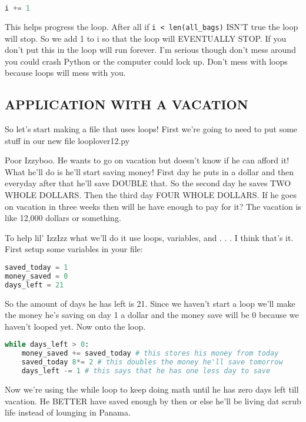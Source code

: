 \documentclass{article}
\begin{document}
\begin{lstlisting}[language=Python]
i += 1
\end{lstlisting}

This helps progress the loop. 
After all if \verb|i < len(all_bags)| ISN'T true the loop will stop. 
So we add 1 to i so that the loop will EVENTUALLY STOP. 
If you don't put this in the loop will run forever. 
I'm serious though don't mess around you could crash Python or the computer could 
lock up. 
Don't mess with loops because loops will mess with you.

\newpage
\subsection{APPLICATION WITH A VACATION}

So let's start making a file that uses loops! 
First we're going to need to put some stuff in our new file looplover12.py

\begin{displayquote}
	Poor Izzyboo. 
    He wants to go on vacation but doesn't know if he can afford it!
    What he'll do is he'll start saving money!
    First day he puts in a dollar and then everyday after that he'll save DOUBLE that. 
    So the second day he saves TWO WHOLE DOLLARS. 
    Then the third day FOUR WHOLE DOLLARS.
    If he goes on vacation in three weeks then will he have enough to pay for it? 
    The vacation is like 12,000 dollars or something.
\end{displayquote}

To help lil' IzzIzz what we'll do it use loops, variables, and . . . I think that's it. 
First setup some variables in your file:
\begin{lstlisting}[language=Python]
saved_today = 1
money_saved = 0
days_left = 21
\end{lstlisting}
So the amount of days he has left is 21. 
Since we haven't start a loop we'll make the money he's saving on day 1 a dollar and 
the money save will be 0 because we haven't looped yet.
Now onto the loop. 
\begin{lstlisting}[language=Python]
while days_left > 0:
    money_saved += saved_today # this stores his money from today
    saved_today 8*= 2 # this doubles the money he'll save tomorrow
    days_left -= 1 # this says that he has one less day to save
\end{lstlisting}

Now we're using the while loop to keep doing math until he has zero days left till vacation. 
He BETTER have saved enough by then or else he'll be living dat scrub life instead of lounging in 
Panama.
\end{document}

